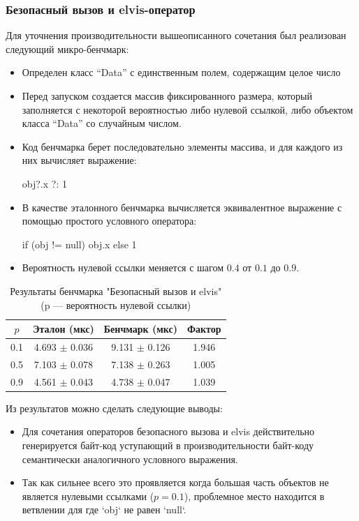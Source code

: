 \subsubsection{Безопасный вызов и elvis-оператор}
Для уточнения производительности вышеописанного сочетания был реализован следующий микро-бенчмарк:
\begin{itemize}
    \item Определен класс ``Data'' с единственным полем, содержащим целое число
    \item Перед запуском создается массив фиксированного размера, который заполняется с некоторой
    вероятностью либо нулевой ссылкой, либо объектом класса ``Data'' со случайным числом.
    \item Код бенчмарка берет последовательно элементы массива, и для каждого из них
    вычисляет выражение:
    \begin{pyglist}[language=kotlin]
    obj?.x ?: 1
    \end{pyglist}
    \item В качестве эталонного бенчмарка вычисляется эквивалентное выражение с помощью простого
    условного оператора:
    \begin{pyglist}[language=kotlin]
    if (obj != null) obj.x else 1
    \end{pyglist}

    \item Вероятность нулевой ссылки меняется с шагом $0.4$ от $0.1$ до $0.9$.
\end{itemize}

\begin{table}[h]
\begin{center}
\begin{tabular}{|c|c|c|c|} \hline
$p$ & Эталон (мкс) & Бенчмарк (мкс) & Фактор \\ \hline
0.1 & 4.693 $\pm$ 0.036 & 9.131 $\pm$ 0.126 & 1.946\\ \hline
0.5 & 7.103 $\pm$ 0.078 & 7.138 $\pm$ 0.263 & 1.005\\ \hline
0.9 & 4.561 $\pm$ 0.043 & 4.738 $\pm$ 0.047 & 1.039\\ \hline
\end{tabular}
\caption{Результаты бенчмарка "Безопасный вызов и elvis" \newline (p --- вероятность нулевой ссылки)}
\end{center}
\end{table}

Из результатов можно сделать следующие выводы:
\begin{itemize}
    \item Для сочетания операторов безопасного вызова и elvis действительно генерируется байт-код
    уступающий в производительности байт-коду семантически аналогичного условного выражения.

    \item Так как сильнее всего это проявляется когда большая часть объектов не является нулевыми
    ссылками ($p = 0.1$), проблемное место находится в ветвлении для где `obj` не равен `null`.
\end{itemize}

